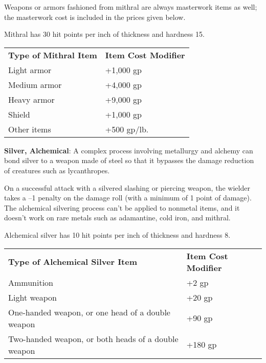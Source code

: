 Weapons or armors fashioned from mithral are always masterwork items as well; the masterwork cost is included in the prices given below.
	
Mithral has 30 hit points per inch of thickness and hardness 15.
			
\begin{table}
\sffamily
 \begin{tabular}{ll}
\textbf{Type of Mithral Item} & \textbf{Item Cost Modifier}\\
Light armor & +1,000 gp\\
Medium armor & +4,000 gp\\
Heavy armor & +9,000 gp\\
Shield & +1,000 gp\\
Other items & +500 gp/lb.\\
 \end{tabular}
\end{table}
		
\textbf{Silver, Alchemical}: A complex process involving metallurgy and alchemy can bond silver to a weapon made of steel so that it bypasses the damage reduction of creatures such as lycanthropes.
	
On a successful attack with a silvered slashing or piercing weapon, the wielder takes a --1 penalty on the damage roll (with a minimum of 1 point of damage). The alchemical silvering process can't be applied to nonmetal items, and it doesn't work on rare metals such as adamantine, cold iron, and mithral.
	
Alchemical silver has 10 hit points per inch of thickness and hardness 8.
			
\begin{table}
 \sffamily
 \begin{tabular}{ll}
  \textbf{Type of Alchemical Silver Item} & \textbf{Item Cost Modifier} \\
  Ammunition & +2 gp\\
  Light weapon & +20 gp\\
  One-handed weapon, or one head of a double weapon & +90 gp \\
  Two-handed weapon, or both heads of a double weapon & +180 gp 
 \end{tabular}
\end{table}
	
